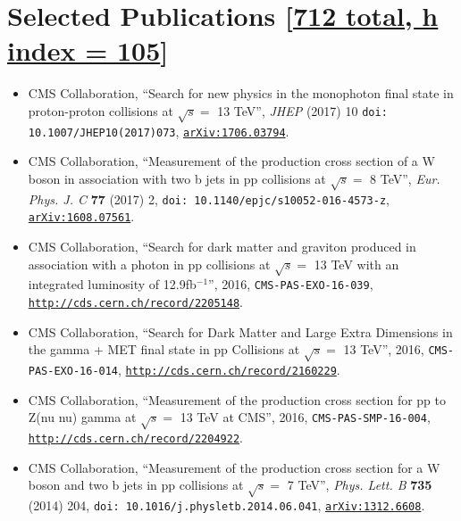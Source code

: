 \documentclass[letterpaper,11pt]{article} %
\begin{document}
\section{Selected Publications [\href{https://inspirehep.net/author/profile/T.Perry.1}{712 total, h index = 105}]}

\begin{itemize}

\item CMS Collaboration, 
  ``Search for new physics in the monophoton final state in proton-proton collisions at $\sqrt{s}=$ 13 TeV'',
  \emph{JHEP} (2017) 10
  \texttt{doi: 10.1007/JHEP10(2017)073},
  \texttt{\href{http://arxiv.org/abs/1706.03794}{arXiv:1706.03794}}.

\item CMS Collaboration, 
  ``Measurement of the production cross section of a W boson
  in association with two b jets in pp collisions at $\sqrt{s}=$ 8 TeV'',
  \emph{Eur. Phys. J. C} {\bf 77} (2017) 2, 
  \texttt{doi: 10.1140/epjc/s10052-016-4573-z},
  \texttt{\href{http://arxiv.org/abs/1608.07561}{arXiv:1608.07561}}.

\item CMS Collaboration, 
  ``Search for dark matter and graviton produced in
  association with a photon in pp collisions at $\sqrt{s}=$ 13 TeV
  with an integrated luminosity of 12.9fb$^{-1}$'',
  2016,
  \texttt{CMS-PAS-EXO-16-039}, \\
  \texttt{\href{http://cds.cern.ch/record/2205148}{http://cds.cern.ch/record/2205148}}.

\item CMS Collaboration, 
  ``Search for Dark Matter and Large Extra Dimensions in the
  gamma + MET final state in pp Collisions at $\sqrt{s}=$ 13 TeV'',
  2016,
  \texttt{CMS-PAS-EXO-16-014},
  \texttt{\href{http://cds.cern.ch/record/2160229}{http://cds.cern.ch/record/2160229}}.

\item CMS Collaboration, 
  ``Measurement of the production cross section for pp to 
  Z(nu nu) gamma at $\sqrt{s}=$ 13 TeV at CMS'', 2016,
  \texttt{CMS-PAS-SMP-16-004},
  \texttt{\href{http://cds.cern.ch/record/2204922}{http://cds.cern.ch/record/2204922}}.

\item CMS Collaboration, 
  ``Measurement of the production cross section for a W boson
  and two b jets in pp collisions at $\sqrt{s}=$ 7 TeV'',
  \emph{Phys. Lett. B} {\bf 735} (2014) 204, 
  \texttt{doi: 10.1016/j.physletb.2014.06.041},
  \texttt{\href{http://arxiv.org/abs/1312.6608}{arXiv:1312.6608}}.


\end{itemize}
\end{document}

